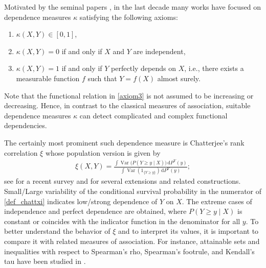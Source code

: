 \documentclass{article}
\newcommand{\de}{\mathrm{\,d}}
\newcommand{\Var}{\operatorname{Var}}
\begin{document}
Motivated by the seminal papers \cite{dette2013copula,chatterjee2021new,azadkia2021simple}, in the last decade many works have focused on dependence measures \(\kappa\) satisfying the following axioms:
\begin{enumerate}[label = (\Roman*)]
    \item \label{axiom1} \(\kappa(X,Y) \in [0,1]\),
    \item \label{axiom2} \(\kappa(X,Y) = 0\) if and only if \(X\) and \(Y\) are independent,
    \item \label{axiom3} \(\kappa(X,Y) = 1\) if and only if \(Y\) perfectly depends on \(X\), i.e., there exists a measurable function \(f\) such that \(Y = f(X)\) almost surely.
\end{enumerate}
Note that the functional relation in \ref{axiom3} is not assumed to be increasing or decreasing.
Hence, in contrast to the classical measures of association, suitable dependence measures \(\kappa\) can detect complicated and complex functional dependencies.

The certainly most prominent such dependence measure is Chatterjee's rank correlation \(\xi\) \cite{chatterjee2021new} whose population version is given by
\begin{align}\label{def_chattxi}
    \xi(X,Y) = \frac{\int \Var\bigl(P(Y\geq y \mid X)\bigr) \de P^Y(y)}{\int \Var(1_{\{Y\geq y\}}) \de P^Y(y)};
\end{align}
see \cite{chatterjee2024survey} for a recent survey and \cite{ansari2025direct,ansari2026quantifying,gamboa2022global,huang2022kernel,strothmann2024rearranged,wiesel2022measuring} for several extensions and related constructions.
Small/Large variability of the conditional survival probability in the numerator of \eqref{def_chattxi} indicates low/strong dependence of \(Y\) on \(X\).
The extreme cases of independence and perfect dependence are obtained, where \(P(Y\geq y\mid X)\) is constant or coincides with the indicator function in the denominator for all \(y\).
To better understand the behavior of \(\xi\) and to interpret its values, it is important to compare it with related measures of association.
For instance, attainable sets and inequalities with respect to Spearman's rho, Spearman's footrule, and Kendall's tau have been studied in \cite{ansari2026exact,rockel2026exact,rockel2026kendall}.
\end{document}
